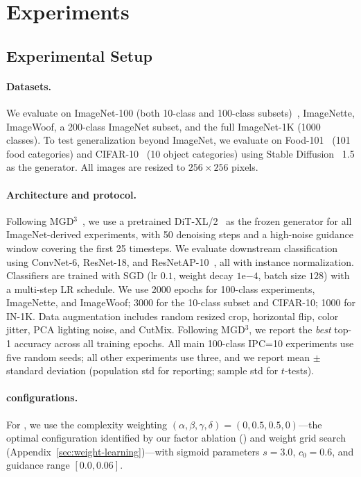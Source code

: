 \section{Experiments}
\label{sec:experiments}

\subsection{Experimental Setup}
\label{sec:setup}

\paragraph{Datasets.}
We evaluate on ImageNet-100 (both 10-class and 100-class subsets)~\cite{russakovsky2014imagenet}, ImageNette, ImageWoof, a 200-class ImageNet subset, and the full ImageNet-1K (1000 classes). To test generalization beyond ImageNet, we evaluate on Food-101~\cite{bossard2014food101} (101 food categories) and CIFAR-10~\cite{krizhevsky2009learning} (10 object categories) using Stable Diffusion~\cite{rombach2021highresolution} 1.5 as the generator. All images are resized to $256 \times 256$ pixels.

\paragraph{Architecture and protocol.}
Following MGD$^3$~\cite{chansantiago2025modeguided}, we use a pretrained DiT-XL/2~\cite{peebles2022scalable} as the frozen generator for all ImageNet-derived experiments, with 50 denoising steps and a high-noise guidance window covering the first 25 timesteps. We evaluate downstream classification using ConvNet-6, ResNet-18, and ResNetAP-10~\cite{kaiming2015deep}, all with instance normalization. Classifiers are trained with SGD (lr $0.1$, weight decay $1\text{e}{-4}$, batch size $128$) with a multi-step LR schedule. We use 2000 epochs for 100-class experiments, ImageNette, and ImageWoof; 3000 for the 10-class subset and CIFAR-10; 1000 for IN-1K. Data augmentation includes random resized crop, horizontal flip, color jitter, PCA lighting noise, and CutMix. Following MGD$^3$, we report the \emph{best} top-1 accuracy across all training epochs. All main 100-class IPC=10 experiments use five random seeds; all other experiments use three, and we report mean $\pm$ standard deviation (population std for reporting; sample std for $t$-tests).

\paragraph{\ags{} configurations.}
For \cags{}, we use the complexity weighting $(\alpha, \beta, \gamma, \delta) = (0, 0.5, 0.5, 0)$---the optimal configuration identified by our factor ablation () and weight grid search (Appendix~\ref{sec:weight-learning})---with sigmoid parameters $s = 3.0$, $c_0 = 0.6$, and guidance range $[0.0, 0.06]$.

